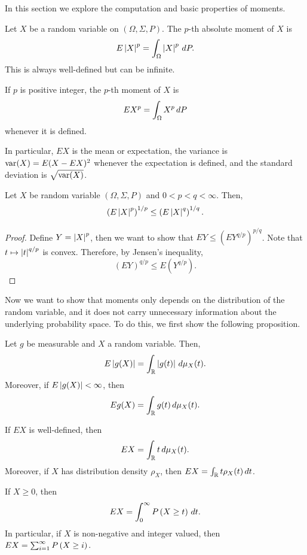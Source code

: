 \documentclass[a4paper]{article}
\begin{document}
In this section we explore the computation and basic properties of
moments.

\begin{defi}[moments]
  Let $X$ be a random variable on $(\Omega, \Sigma, P)$.
  The $p$-th absolute moment of $X$ is
  \[
    E \left\lvert X\right\rvert^p = \int_\Omega \left\lvert X\right\rvert^p \, d P.
  \]
  This is always well-defined but can be infinite.

  If $p$ is positive integer, the $p$-th moment of $X$ is
  \[
    E X^p = \int_\Omega X^p \, d P
  \]
  whenever it is defined.

  In particular, $E X$ is the mean or expectation, the variance is
  $\operatorname{var} (X) = E (X - E X)^2$ whenever the expectation is defined,
  and the standard deviation is $\sqrt{\operatorname{var} (X)}$.
\end{defi}

\begin{prop}
  Let $X$ be random variable $(\Omega, \Sigma, P)$ and
  $0 < p < q < \infty$. Then,
  \[
    \left( E \left\lvert X\right\rvert^p \right)^{1 / p} \leq \left( E \left\lvert X\right\rvert^q \right)^{1 / q}.
  \]
\end{prop}

\begin{proof}
  Define $Y = \left\lvert X\right\rvert^p$, then we want to show that
  $E Y \leq (E Y^{q / p})^{p / q}$. Note that $t \mapsto \left\lvert t\right\rvert^{q / p}$
  is convex. Therefore, by Jensen's inequality,
  \[
    \left( E Y \right)^{q / p}  \leq E \left( Y^{q / p} \right).
  \]

\end{proof}

Now we want to show that moments only depends on the distribution of the
random variable, and it does not carry unnecessary information about the
underlying probability space. To do this, we first show the following
proposition.

\begin{prop}
  Let $g$ be measurable and $X$ a random variable. Then,
  \[
    E \left\lvert g(X)\right\rvert = \int_{\mathbb{R}} \left\lvert g(t)\right\rvert \, d \mu_X (t).
  \]
  Moreover, if $E \left\lvert g(X)\right\rvert < \infty$, then
  \[
    E g(X) = \int_{\mathbb{R}} g(t) \, d \mu_X (t).
  \]
\end{prop}

\begin{cor}
  If $E X$ is well-defined, then
  \[
    E X = \int_{\mathbb{R}} t \, d \mu_X (t).
  \]
  Moreover, if $X$ has distribution density $\rho_X$, then
  $E X = \int_{\mathbb{R}} t \rho_X (t) \, d t$.
\end{cor}

\begin{prop}
  If $X \geq 0$, then
  \[
    E X = \int_0^\infty P \left( X \geq t \right) \, d t.
  \]
  In particular, if $X$ is non-negative and integer valued, then
  $E X = \sum_{i=1}^\infty P \left( X \geq i \right)$.
\end{prop}
\end{document}
